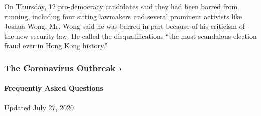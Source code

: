 On Thursday,
\href{https://www.nytimes3xbfgragh.onion/2020/07/29/world/asia/hong-kong-arrests-security-law.html}{12
pro-democracy candidates said they had been barred from running},
including four sitting lawmakers and several prominent activists like
Joshua Wong. Mr. Wong said he was barred in part because of his
criticism of the new security law. He called the disqualifications ``the
most scandalous election fraud ever in Hong Kong history.''

\href{https://www.nytimes3xbfgragh.onion/news-event/coronavirus?action=click\&pgtype=Article\&state=default\&region=MAIN_CONTENT_3\&context=storylines_faq}{}

\hypertarget{the-coronavirus-outbreak-}{%
\subsubsection{The Coronavirus Outbreak
›}\label{the-coronavirus-outbreak-}}

\hypertarget{frequently-asked-questions}{%
\paragraph{Frequently Asked
Questions}\label{frequently-asked-questions}}

Updated July 27, 2020


